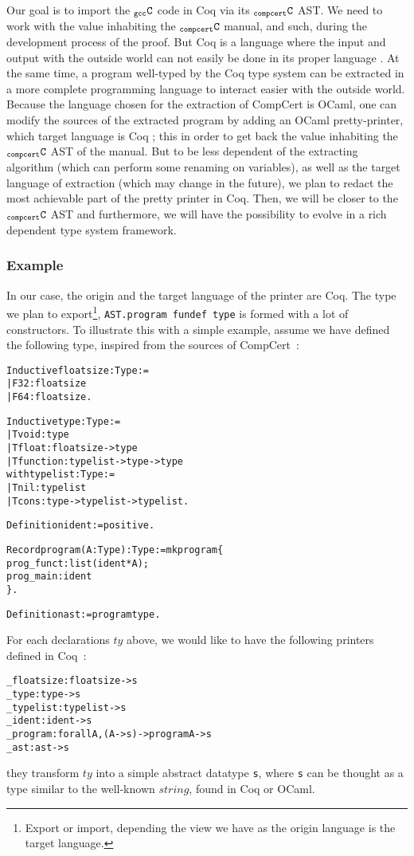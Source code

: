 \documentclass[a4paper, 11pt]{article}
\newenvironment{coq}
  {%
   \begin{alltt}
   \footnotesize} %% 8.3pl2 (April 2011)
  {\end{alltt} %
  }
\newcommand{\C}{$_{\tt compcert}{\tt C}$\xspace}
\newcommand{\gccC}{$_{\tt gcc}{\tt C}$\xspace}
\newcommand{\outworld}{the outside world\xspace}
\begin{document}
Our goal is to import the \gccC code in Coq via its \C AST. We need to work with the value inhabiting the \C manual, and such, during the development process of the proof. But Coq is a language where the input and output with \outworld can not easily be done in its proper language%
. At the same time, a program well-typed by the Coq type system can be extracted in a more complete programming language to interact easier with \outworld. Because the language chosen for the extraction of CompCert is OCaml, one can modify the sources of the extracted program by adding an OCaml pretty-printer, which target language is Coq ; this in order to get back the value inhabiting the \C AST of the manual. But to be less dependent of the extracting algorithm (which can perform some renaming on variables), as well as the target language of extraction (which may change in the future), we plan to redact the most achievable part of the pretty printer in Coq. Then, we will be closer to the \C AST and furthermore, we will have the possibility to evolve in a rich dependent type system framework. 
\subsubsection{Example}
In our case, the origin and the target language of the printer are Coq. The type we plan to export\footnote{Export or import, depending the view we have as the origin language is the target language.}, \verb|AST.program fundef type| is formed with a lot of constructors. To illustrate this with a simple example, assume we have defined the following type, inspired from the sources of CompCert~:
\begin{coq}
Inductive floatsize : Type :=
  | F32: floatsize
  | F64: floatsize.

Inductive type : Type :=
  | Tvoid : type
  | Tfloat: floatsize -> type
  | Tfunction: typelist -> type -> type
with typelist : Type :=
  | Tnil : typelist
  | Tcons : type -> typelist -> typelist.

Definition ident := positive.

Record program (A : Type) : Type := mkprogram \{
  prog_funct : list (ident * A);
  prog_main : ident
\}.

Definition ast := program type.
\end{coq}
For each declarations $ty$ above, we would like to have the following printers defined in Coq~:
\begin{coq}
_floatsize : floatsize -> s
_type : type -> s
_typelist : typelist -> s
_ident : ident -> s
_program : forall A, (A -> s) -> program A -> s
_ast : ast -> s
\end{coq}
they transform $ty$ into a simple abstract datatype \verb|s|, where \verb|s| can be thought as a type similar to the well-known $string$, found in Coq or OCaml.
\end{document}

